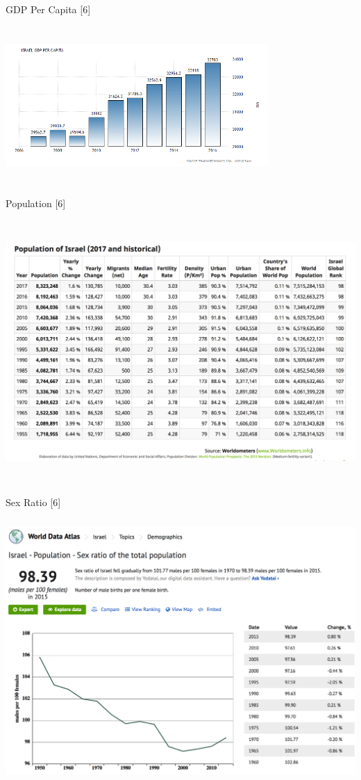 \documentclass[10pt]{article}
\begin{document}
\begin{center}
GDP Per Capita [6]
\end{center}
\includegraphics[width=10cm, height=6cm]{capita.png}
\\
\begin{center}
Population [6]
\end{center}
\includegraphics[width=16cm, height=10cm]{popula.png}
\\
\begin{center}
Sex Ratio [6]
\end{center}
\includegraphics[width=14cm, height=10cm]{sexratio.png}
\end{document}
